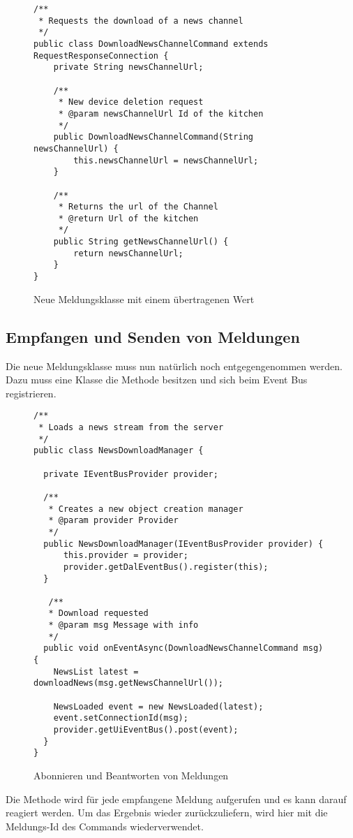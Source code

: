 \begin{figure}[H]
\begin{lstlisting}
/**
 * Requests the download of a news channel
 */
public class DownloadNewsChannelCommand extends RequestResponseConnection {
    private String newsChannelUrl;

    /**
     * New device deletion request
     * @param newsChannelUrl Id of the kitchen
     */
    public DownloadNewsChannelCommand(String newsChannelUrl) {
        this.newsChannelUrl = newsChannelUrl;
    }

    /**
     * Returns the url of the Channel
     * @return Url of the kitchen
     */
    public String getNewsChannelUrl() {
        return newsChannelUrl;
    }
}
\end{lstlisting}
\caption{Neue Meldungsklasse mit einem übertragenen Wert}
\end{figure}

\subsection{Empfangen und Senden von Meldungen}
Die neue Meldungsklasse muss nun natürlich noch entgegengenommen werden. Dazu muss eine Klasse die Methode  besitzen und sich beim Event Bus registrieren.

\begin{figure}[H]
\begin{lstlisting}
/**
 * Loads a news stream from the server
 */
public class NewsDownloadManager {

  private IEventBusProvider provider;

  /**
   * Creates a new object creation manager
   * @param provider Provider
   */
  public NewsDownloadManager(IEventBusProvider provider) {
      this.provider = provider;
      provider.getDalEventBus().register(this);
  }
  
   /**
   * Download requested
   * @param msg Message with info
   */
  public void onEventAsync(DownloadNewsChannelCommand msg) {
  	NewsList latest = downloadNews(msg.getNewsChannelUrl());
  	
  	NewsLoaded event = new NewsLoaded(latest);
  	event.setConnectionId(msg);
  	provider.getUiEventBus().post(event);
  }
}
\end{lstlisting}
\caption{Abonnieren und Beantworten von Meldungen}
\end{figure}


Die Methode wird für jede empfangene Meldung aufgerufen und es kann darauf reagiert werden. Um das Ergebnis wieder zurückzuliefern, wird hier mit  die Meldungs-Id des Commands wiederverwendet.

